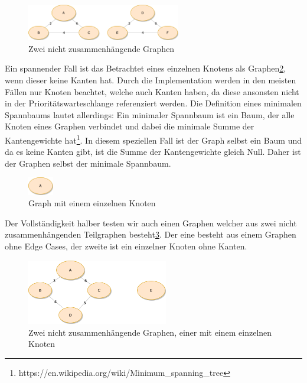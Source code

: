 \documentclass[a4paper]{article}
\begin{document}
\begin{figure}[htbp]
	\centering
		\includegraphics[width=0.60\textwidth]{Latex/Figs/Beispielgraph_2.png}		
	\caption{Zwei nicht zusammenhängende Graphen}
	\label{fig:beispielgraph_2}
\end{figure}

Ein spannender Fall ist das Betrachtet eines einzelnen Knotens als Graphen\ref{fig:beispielgraph_3}, wenn dieser keine Kanten hat. Durch die Implementation werden in den meisten Fällen nur Knoten beachtet, welche auch Kanten haben, da diese ansonsten nicht in der Prioritätswarteschlange referenziert werden. Die Definition eines minimalen Spannbaums lautet allerdings: Ein minimaler Spannbaum ist ein Baum, der alle Knoten eines Graphen verbindet und dabei die minimale Summe der Kantengewichte hat\footnote{https://en.wikipedia.org/wiki/Minimum\_spanning\_tree}. In diesem speziellen Fall ist der Graph selbst ein Baum und da es keine Kanten gibt, ist die Summe der Kantengewichte gleich Null. Daher ist der Graphen selbst der minimale Spannbaum.

\begin{figure}[htbp]
	\centering
		\includegraphics[width=0.1\textwidth]{Latex/Figs/Beispielgraph_3.png}		
	\caption{Graph mit einem einzelnen Knoten}
	\label{fig:beispielgraph_3}
\end{figure}

Der Vollständigkeit halber testen wir auch einen Graphen welcher aus zwei nicht zusammenhängenden Teilgraphen besteht\ref{fig:beispielgraph_1}. Der eine besteht aus einem Graphen ohne Edge Cases, der zweite ist ein einzelner Knoten ohne Kanten. 

\begin{figure}[htbp]
	\centering
		\includegraphics[width=0.55\textwidth]{Latex/Figs/Beispielgraph_1.png}		
	\caption{Zwei nicht zusammenhängende Graphen, einer mit einem einzelnen Knoten}
	\label{fig:beispielgraph_1}
\end{figure}
\end{document}
